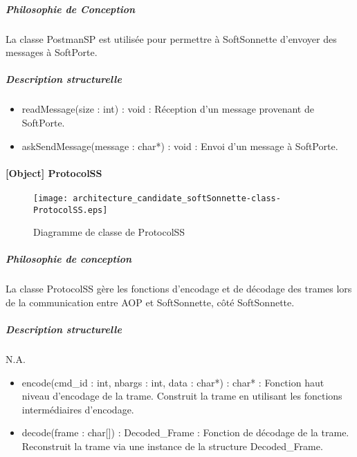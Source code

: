             \subparagraph{Philosophie de Conception}%
                
            La classe PostmanSP est utilisée pour permettre à SoftSonnette d'envoyer des messages à SoftPorte.                

            \subparagraph{Description structurelle}%
                


            \begin{itemize}
                \item {readMessage(size : int) : void : Réception d'un message provenant de SoftPorte.}
                \item {askSendMessage(message : char*) : void : Envoi d'un message à SoftPorte.} 
            \end{itemize}  

\newpage

    \paragraph{[Object] ProtocolSS}

        \begin{figure} [H]
            \centering
            \texttt{[image: architecture\_candidate\_softSonnette-class-ProtocolSS.eps]}
            \caption{Diagramme de classe de ProtocolSS}
            \label{Classe-ProtocolSS}
        \end{figure}

            \subparagraph{Philosophie de conception}

            La classe ProtocolSS gère les fonctions d'encodage et de décodage des trames lors de la communication entre AOP et SoftSonnette, côté SoftSonnette.

            \subparagraph{Description structurelle}

            N.A. 

            \begin{itemize}
                \item {encode(cmd\_id : int, nbargs : int, data : char*) : char* : Fonction haut niveau d'encodage de la trame. 
                Construit la trame en utilisant les fonctions intermédiaires d'encodage.}
                \item {decode(frame : char[]) : Decoded\_Frame : Fonction de décodage de la trame. 
                Reconstruit la trame via une instance de la structure Decoded\_Frame.} 
            \end{itemize} 

